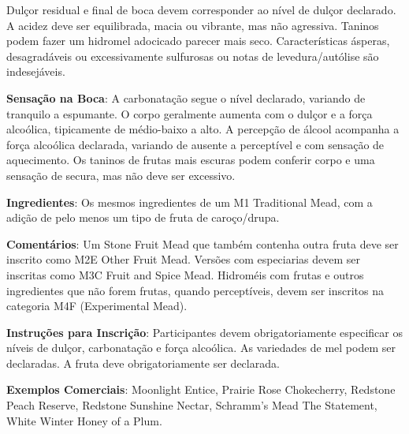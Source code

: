 Dulçor residual e final de boca devem corresponder ao nível de dulçor declarado. A acidez deve ser equilibrada, macia ou vibrante, mas não agressiva. Taninos podem fazer um hidromel adocicado parecer mais seco. Características ásperas, desagradáveis ou excessivamente sulfurosas ou notas de levedura/autólise são indesejáveis.

\textbf{Sensação na Boca}: A carbonatação segue o nível declarado, variando de tranquilo a espumante. O corpo geralmente aumenta com o dulçor e a força alcoólica, tipicamente de médio-baixo a alto. A percepção de álcool acompanha a força alcoólica declarada, variando de ausente a perceptível e com sensação de aquecimento. Os taninos de frutas mais escuras podem conferir corpo e uma sensação de secura, mas não deve ser excessivo.

\textbf{Ingredientes}: Os mesmos ingredientes de um M1 Traditional Mead, com a adição de pelo menos um tipo de fruta de caroço/drupa.

\textbf{Comentários}: Um Stone Fruit Mead que também contenha outra fruta deve ser inscrito como M2E Other Fruit Mead. Versões com especiarias devem ser inscritas como M3C Fruit and Spice Mead. Hidroméis com frutas e outros ingredientes que não forem frutas, quando perceptíveis, devem ser inscritos na categoria M4F (Experimental Mead).

\textbf{Instruções para Inscrição}: Participantes devem obrigatoriamente especificar os níveis de dulçor, carbonatação e força alcoólica. As variedades de mel podem ser declaradas. A fruta deve obrigatoriamente ser declarada.

\textbf{Exemplos Comerciais}: Moonlight Entice, Prairie Rose Chokecherry, Redstone Peach Reserve, Redstone Sunshine Nectar, Schramm's Mead The Statement, White Winter Honey of a Plum.
